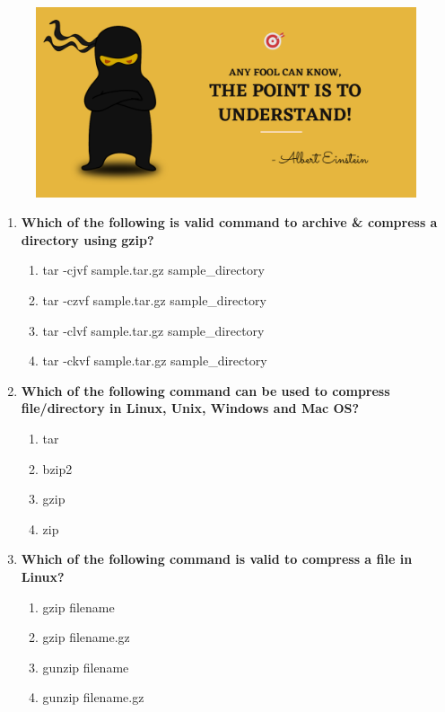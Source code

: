 \setlength{\columnsep}{3pt}
\begin{flushleft}
	
	\paragraph{}
	\bigskip
	
	\begin{figure}[h!]
		\centering
		\includegraphics[scale=.2]{content/practise.jpg}
	\end{figure}	
	\begin{enumerate}
			
		\item \textbf{Which of the following is valid command to archive \& compress a directory using gzip?}
		\begin{enumerate}[label=(\alph*)]
			\item tar -cjvf sample.tar.gz  sample\_directory
			\item tar -czvf sample.tar.gz  sample\_directory   %
			\item tar -clvf sample.tar.gz  sample\_directory
			\item tar -ckvf sample.tar.gz  sample\_directory
		\end{enumerate}
		\bigskip
		\bigskip
		
		\item \textbf{Which of the following command can be used to compress file/directory in Linux, Unix, Windows and Mac OS?}
		\begin{enumerate}[label=(\alph*)]
			\item tar
			\item bzip2
			\item gzip
			\item zip     %
		\end{enumerate}
		\bigskip
		\bigskip	
		
		\item \textbf{Which of the following command is valid to compress a file in Linux?}
		\begin{enumerate}[label=(\alph*)]
			\item gzip filename         %
			\item gzip filename.gz
			\item gunzip filename
			\item gunzip filename.gz
		\end{enumerate}
		\bigskip
		\bigskip
		

\end{enumerate}
\end{flushleft}
